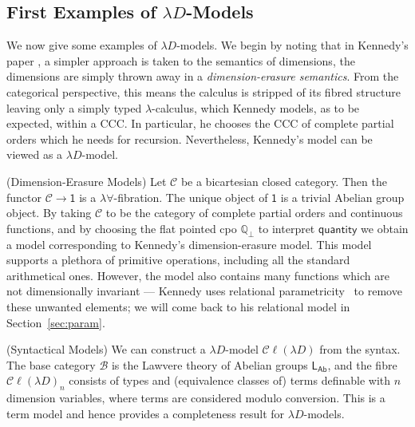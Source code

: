 \documentclass[a4paper,UKenglish]{lipics}
\newcommand{\ra}{\rightarrow}
\newcommand{\msf}[1]{\mathsf{#1}} %
\newcommand{\LAb}{\msf{L}_{\msf{Ab}}}
\newcommand{\terminal}{\msf{1}}
\newcommand{\ClLD}{\mathcal{C\ell}(\lambda{}D)} %
\newcommand{\B}{\mathcal{B}}
\newcommand{\C}{\mathcal{C}}
\newcommand{\bbQ}{\mathbb{Q}}
\newcommand{\qnt}{\msf{quantity}}
\begin{document}
\subsection{First Examples of $\lambda D$-Models}
We now give some examples of $\lambda D$-models. We begin by noting that in Kennedy's paper \cite{Kennedy:1997:RPU:263699.263761}, a simpler approach is taken to the semantics of dimensions, the dimensions are simply thrown away in a {\em dimension-erasure semantics}. From the categorical perspective, this means the calculus is stripped of its fibred structure leaving only a simply typed $\lambda$-calculus, which Kennedy models, as to be expected, within a CCC. In particular, he chooses the CCC of complete partial orders which he needs for recursion. Nevertheless, Kennedy's model can be viewed as a $\lambda D$-model.


\begin{example}(Dimension-Erasure Models)
\label{ex:UnitErasure}
Let $\C$ be a bicartesian closed category. Then the functor $\C \ra
\terminal$ is a $\lambda\forall$-fibration. The unique object of
$\terminal$ is a trivial Abelian group object. By taking $\C$ to be
the category of complete partial orders and continuous functions, and
by choosing the flat pointed cpo $\bbQ_{\bot}$ to interpret $\qnt$ we
obtain a model corresponding to Kennedy's dimension-erasure model. This
model supports a plethora of primitive operations, including all the
standard arithmetical ones. However, the model also contains many
functions which are not dimensionally invariant --- Kennedy uses
relational parametricity~\cite{reynolds1983types} to remove these
unwanted elements; we will come back to his relational model in
Section~\ref{sec:param}.
\end{example}


\begin{example}(Syntactical Models)
We can construct a $\lambda D$-model $\ClLD$ from the syntax. The base category $\B$ is the Lawvere theory of Abelian groups $\LAb$, and the fibre $\ClLD_n$ consists of types and (equivalence classes of) terms definable with $n$ dimension variables, where terms are considered modulo conversion. This is a term model and hence provides a completeness result for $\lambda D$-models.
\end{example}
\end{document}
